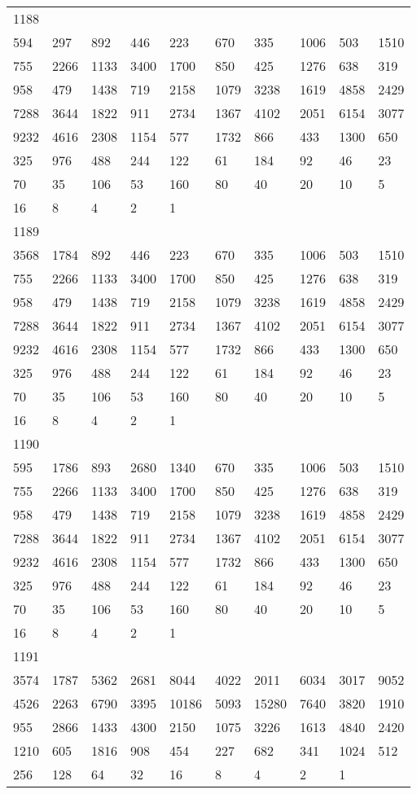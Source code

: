\begin{longtable}{*{10}{l}}
1188&&&&&&&&&\\
594& 297& 892& 446& 223& 670& 335& 1006& 503& 1510\\
755& 2266& 1133& 3400& 1700& 850& 425& 1276& 638& 319\\
958& 479& 1438& 719& 2158& 1079& 3238& 1619& 4858& 2429\\
7288& 3644& 1822& 911& 2734& 1367& 4102& 2051& 6154& 3077\\
9232& 4616& 2308& 1154& 577& 1732& 866& 433& 1300& 650\\
325& 976& 488& 244& 122& 61& 184& 92& 46& 23\\
70& 35& 106& 53& 160& 80& 40& 20& 10& 5\\
16& 8& 4& 2& 1& \\

1189&&&&&&&&&\\
3568& 1784& 892& 446& 223& 670& 335& 1006& 503& 1510\\
755& 2266& 1133& 3400& 1700& 850& 425& 1276& 638& 319\\
958& 479& 1438& 719& 2158& 1079& 3238& 1619& 4858& 2429\\
7288& 3644& 1822& 911& 2734& 1367& 4102& 2051& 6154& 3077\\
9232& 4616& 2308& 1154& 577& 1732& 866& 433& 1300& 650\\
325& 976& 488& 244& 122& 61& 184& 92& 46& 23\\
70& 35& 106& 53& 160& 80& 40& 20& 10& 5\\
16& 8& 4& 2& 1& \\

1190&&&&&&&&&\\
595& 1786& 893& 2680& 1340& 670& 335& 1006& 503& 1510\\
755& 2266& 1133& 3400& 1700& 850& 425& 1276& 638& 319\\
958& 479& 1438& 719& 2158& 1079& 3238& 1619& 4858& 2429\\
7288& 3644& 1822& 911& 2734& 1367& 4102& 2051& 6154& 3077\\
9232& 4616& 2308& 1154& 577& 1732& 866& 433& 1300& 650\\
325& 976& 488& 244& 122& 61& 184& 92& 46& 23\\
70& 35& 106& 53& 160& 80& 40& 20& 10& 5\\
16& 8& 4& 2& 1& \\

1191&&&&&&&&&\\
3574& 1787& 5362& 2681& 8044& 4022& 2011& 6034& 3017& 9052\\
4526& 2263& 6790& 3395& 10186& 5093& 15280& 7640& 3820& 1910\\
955& 2866& 1433& 4300& 2150& 1075& 3226& 1613& 4840& 2420\\
1210& 605& 1816& 908& 454& 227& 682& 341& 1024& 512\\
256& 128& 64& 32& 16& 8& 4& 2& 1& \\


\end{longtable}
